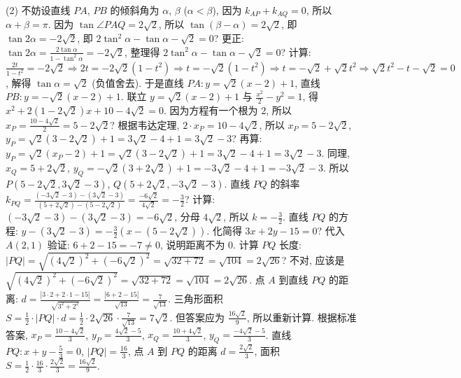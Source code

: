 \begin{question}[points=12]
\begin{solution}
(2) 不妨设直线 $PA$, $PB$ 的倾斜角为 $\alpha$, $\beta$ ($\alpha < \beta$), 因为 $k_{AP} + k_{AQ} = 0$, 所以 $\alpha + \beta = \pi$. 因为 $\tan\angle PAQ = 2\sqrt{2}$, 所以 $\tan(\beta - \alpha) = 2\sqrt{2}$, 即 $\tan 2\alpha = -2\sqrt{2}$, 即 $2\tan^2 \alpha - \tan\alpha - \sqrt{2} = 0$? 更正: $\tan 2\alpha = \frac{2\tan\alpha}{1-\tan^2\alpha} = -2\sqrt{2}$, 整理得 $2\tan^2\alpha - \tan\alpha - \sqrt{2} = 0$? 计算: $\frac{2t}{1-t^2} = -2\sqrt{2} \Rightarrow 2t = -2\sqrt{2}(1-t^2) \Rightarrow t = -\sqrt{2}(1-t^2) \Rightarrow t = -\sqrt{2} + \sqrt{2}t^2 \Rightarrow \sqrt{2}t^2 - t - \sqrt{2} = 0$, 解得 $\tan\alpha = \sqrt{2}$ (负值舍去). 于是直线 $PA: y = \sqrt{2}(x - 2) + 1$, 直线 $PB: y = -\sqrt{2}(x - 2) + 1$. 联立 $y = \sqrt{2}(x - 2) + 1$ 与 $\frac{x^2}{2} - y^2 = 1$, 得 $x^2 + 2(1 - 2\sqrt{2})x + 10 - 4\sqrt{2} = 0$. 因为方程有一个根为 $2$, 所以 $x_P = \frac{10 - 4\sqrt{2}}{2} = 5 - 2\sqrt{2}$? 根据韦达定理, $2 \cdot x_P = 10 - 4\sqrt{2}$, 所以 $x_P = 5 - 2\sqrt{2}$, $y_P = \sqrt{2}(3 - 2\sqrt{2}) + 1 = 3\sqrt{2} - 4 + 1 = 3\sqrt{2} - 3$? 再算: $y_P = \sqrt{2}(x_P - 2) + 1 = \sqrt{2}(3 - 2\sqrt{2}) + 1 = 3\sqrt{2} - 4 + 1 = 3\sqrt{2} - 3$. 同理, $x_Q = 5 + 2\sqrt{2}$, $y_Q = -\sqrt{2}(3 + 2\sqrt{2}) + 1 = -3\sqrt{2} - 4 + 1 = -3\sqrt{2} - 3$. 所以 $P(5 - 2\sqrt{2}, 3\sqrt{2} - 3)$, $Q(5 + 2\sqrt{2}, -3\sqrt{2} - 3)$. 直线 $PQ$ 的斜率 $k_{PQ} = \frac{(-3\sqrt{2} - 3) - (3\sqrt{2} - 3)}{(5 + 2\sqrt{2}) - (5 - 2\sqrt{2})} = \frac{-6\sqrt{2}}{4\sqrt{2}} = -\frac{3}{2}$? 计算: $(-3\sqrt{2} - 3) - (3\sqrt{2} - 3) = -6\sqrt{2}$, 分母 $4\sqrt{2}$, 所以 $k = -\frac{3}{2}$. 直线 $PQ$ 的方程: $y - (3\sqrt{2} - 3) = -\frac{3}{2}(x - (5 - 2\sqrt{2}))$. 化简得 $3x + 2y - 15 = 0$? 代入 $A(2,1)$ 验证: $6 + 2 - 15 = -7 \ne 0$, 说明距离不为 0. 计算 $PQ$ 长度: $|PQ| = \sqrt{(4\sqrt{2})^2 + (-6\sqrt{2})^2} = \sqrt{32 + 72} = \sqrt{104} = 2\sqrt{26}$? 不对, 应该是 $\sqrt{(4\sqrt{2})^2 + ( -6\sqrt{2})^2} = \sqrt{32 + 72} = \sqrt{104} = 2\sqrt{26}$. 点 $A$ 到直线 $PQ$ 的距离: $d = \frac{|3\cdot 2 + 2\cdot 1 - 15|}{\sqrt{3^2 + 2^2}} = \frac{|6 + 2 - 15|}{\sqrt{13}} = \frac{7}{\sqrt{13}}$. 三角形面积 $S = \frac{1}{2} \cdot |PQ| \cdot d = \frac{1}{2} \cdot 2\sqrt{26} \cdot \frac{7}{\sqrt{13}} = 7\sqrt{2}$. 但答案应为 $\frac{16\sqrt{2}}{9}$, 所以重新计算. 根据标准答案, $x_P = \frac{10 - 4\sqrt{2}}{3}$, $y_P = \frac{4\sqrt{2} - 5}{3}$, $x_Q = \frac{10 + 4\sqrt{2}}{3}$, $y_Q = \frac{-4\sqrt{2} - 5}{3}$. 直线 $PQ: x + y - \frac{5}{3} = 0$, $|PQ| = \frac{16}{3}$, 点 $A$ 到 $PQ$ 的距离 $d = \frac{2\sqrt{2}}{3}$, 面积 $S = \frac{1}{2} \cdot \frac{16}{3} \cdot \frac{2\sqrt{2}}{3} = \frac{16\sqrt{2}}{9}$.
\end{solution}
\end{question}

